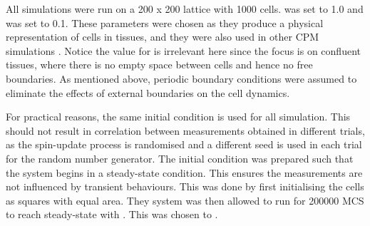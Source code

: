 \documentclass[a4paper,12pt]{article}
\begin{document}
All simulations were run on a 200 x 200 lattice with 1000 cells.  was set to 1.0 and  was set to 0.1. These parameters were chosen as they produce a physical representation of cells in tissues, and they were also used in other CPM simulations \cite{szabo2010}. Notice the value for  is irrelevant here since the focus is on confluent tissues, where there is no empty space between cells and hence no free boundaries. As mentioned above, periodic boundary conditions were assumed to eliminate the effects of external boundaries on the cell dynamics. 

For practical reasons, the same initial condition is used for all simulation. This should not result in correlation between measurements obtained in different trials, as the spin-update process is randomised and a different seed is used in each trial for the random number generator. The initial condition was prepared such that the system begins in a steady-state condition. This ensures the measurements are not influenced by transient behaviours. This was done by first initialising the cells as squares with equal area. They system was then allowed to run for 200000 MCS to reach steady-state with . This was chosen to  .  

%
%
%
\end{document}
